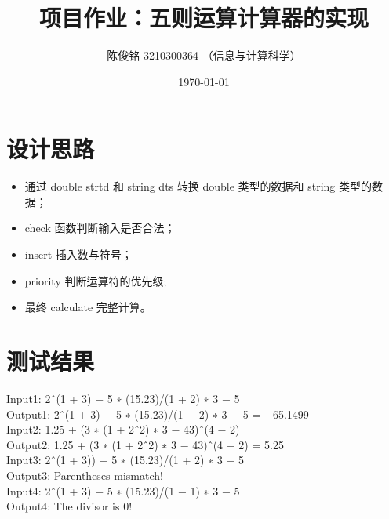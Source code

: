 \documentclass[a4paper]{article}
\title{项目作业：五则运算计算器的实现}
\author{陈俊铭 3210300364 （信息与计算科学）}
\date{\today}
\begin{document}
\maketitle
{}
\section{设计思路}
\begin{itemize}
\item 通过 double strtd 和 string dts 转换 double 类型的数据和 string 类型的数据；
\item check 函数判断输入是否合法；
\item insert 插入数与符号；
\item priority 判断运算符的优先级;
\item 最终 calculate 完整计算。
\end{itemize}

\section{测试结果}
\noindent 
Input1: 2ˆ(1 + 3) − 5 ∗ (15.23)/(1 + 2) ∗ 3 − 5\\
Output1: 2ˆ(1 + 3) − 5 ∗ (15.23)/(1 + 2) ∗ 3 − 5 = −65.1499\\
Input2: 1.25 + (3 ∗ (1 + 2ˆ2) ∗ 3 − 43)ˆ(4 − 2)\\
Output2: 1.25 + (3 ∗ (1 + 2ˆ2) ∗ 3 − 43)ˆ(4 − 2) = 5.25\\
Input3: 2ˆ(1 + 3)) − 5 ∗ (15.23)/(1 + 2) ∗ 3 − 5\\
Output3: Parentheses mismatch!\\
Input4: 2ˆ(1 + 3) − 5 ∗ (15.23)/(1 − 1) ∗ 3 − 5\\
Output4: The divisor is 0!\\
\end{document}
